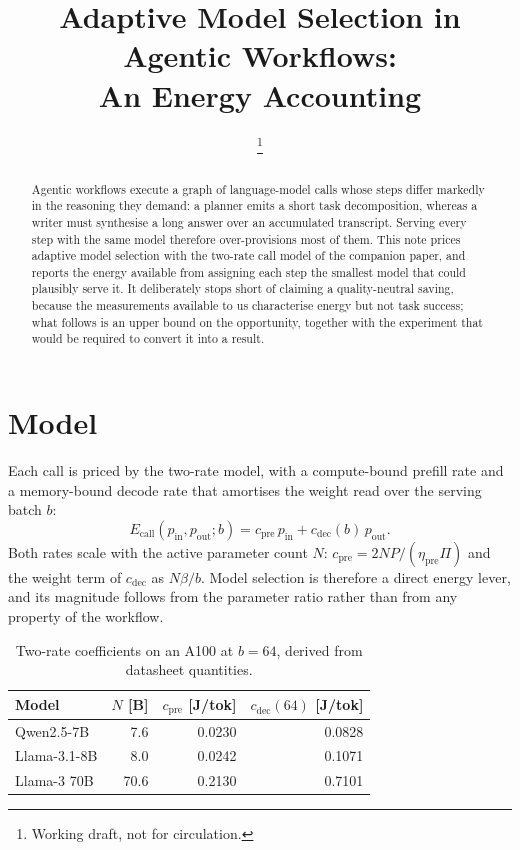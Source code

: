 \documentclass[journal]{IEEEtran}
\begin{document}
\title{Adaptive Model Selection in Agentic Workflows:\\An Energy Accounting}
\author{\thanks{Working draft, not for circulation.}}
\maketitle

\begin{abstract}
Agentic workflows execute a graph of language-model calls whose steps differ markedly in the
reasoning they demand: a planner emits a short task decomposition, whereas a writer must
synthesise a long answer over an accumulated transcript. Serving every step with the same model
therefore over-provisions most of them. This note prices adaptive model selection with the
two-rate call model of the companion paper, and reports the energy available from assigning each
step the smallest model that could plausibly serve it. It deliberately stops short of claiming a
quality-neutral saving, because the measurements available to us characterise energy but not task
success; what follows is an upper bound on the opportunity, together with the experiment that
would be required to convert it into a result.
\end{abstract}

\section{Model}
Each call is priced by the two-rate model, with a compute-bound prefill rate and a
memory-bound decode rate that amortises the weight read over the serving batch $b$:
\begin{equation}
E_{\mathrm{call}}(p_{\mathrm{in}},p_{\mathrm{out}};b)
 = c_{\mathrm{pre}}\,p_{\mathrm{in}} + c_{\mathrm{dec}}(b)\,p_{\mathrm{out}} .
\label{eq:tworate}
\end{equation}
Both rates scale with the active parameter count $N$: $c_{\mathrm{pre}}=2NP/(\eta_{\mathrm{pre}}\Pi)$
and the weight term of $c_{\mathrm{dec}}$ as $N\beta/b$. Model selection is therefore a direct
energy lever, and its magnitude follows from the parameter ratio rather than from any property of
the workflow.

\begin{table}[t]
\caption{Two-rate coefficients on an A100 at $b=64$, derived from datasheet quantities.}
\label{tab:coeff}
\centering
\small
\begin{tabular}{@{}lrrr@{}}
\toprule
Model & $N$ [B] & $c_{\mathrm{pre}}$ [J/tok] & $c_{\mathrm{dec}}(64)$ [J/tok] \\
\midrule
Qwen2.5-7B  &  7.6 & 0.0230 & 0.0828 \\
Llama-3.1-8B &  8.0 & 0.0242 & 0.1071 \\
Llama-3 70B & 70.6 & 0.2130 & 0.7101 \\
\bottomrule
\end{tabular}
\end{table}
\end{document}
